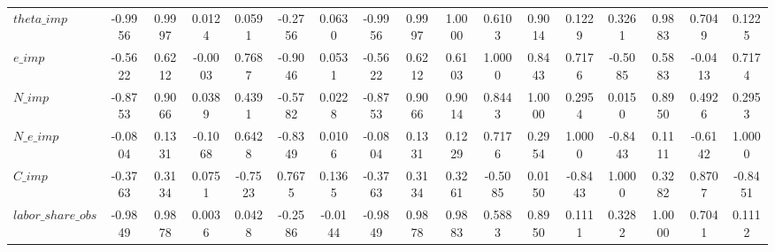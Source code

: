 \begin{center}
\begin{longtable}{lcccccccccccccccc}
$theta\_imp         $	 & 	              -0.9956	 & 	               0.9997	 & 	               0.0124	 & 	               0.0591	 & 	              -0.2756	 & 	               0.0630	 & 	              -0.9956	 & 	               0.9997	 & 	               1.0000	 & 	               0.6103	 & 	               0.9014	 & 	               0.1229	 & 	               0.3261	 & 	               0.9883	 & 	               0.7049	 & 	               0.1225 \\ 
$e\_imp             $	 & 	              -0.5622	 & 	               0.6212	 & 	              -0.0003	 & 	               0.7687	 & 	              -0.9046	 & 	               0.0531	 & 	              -0.5622	 & 	               0.6212	 & 	               0.6103	 & 	               1.0000	 & 	               0.8443	 & 	               0.7176	 & 	              -0.5085	 & 	               0.5883	 & 	              -0.0413	 & 	               0.7174 \\ 
$N\_imp             $	 & 	              -0.8753	 & 	               0.9066	 & 	               0.0389	 & 	               0.4391	 & 	              -0.5782	 & 	               0.0228	 & 	              -0.8753	 & 	               0.9066	 & 	               0.9014	 & 	               0.8443	 & 	               1.0000	 & 	               0.2954	 & 	               0.0150	 & 	               0.8950	 & 	               0.4926	 & 	               0.2953 \\ 
$N\_e\_imp          $	 & 	              -0.0804	 & 	               0.1331	 & 	              -0.1068	 & 	               0.6428	 & 	              -0.8349	 & 	               0.0106	 & 	              -0.0804	 & 	               0.1331	 & 	               0.1229	 & 	               0.7176	 & 	               0.2954	 & 	               1.0000	 & 	              -0.8443	 & 	               0.1111	 & 	              -0.6142	 & 	               1.0000 \\ 
$C\_imp             $	 & 	              -0.3763	 & 	               0.3134	 & 	               0.0751	 & 	              -0.7523	 & 	               0.7675	 & 	               0.1365	 & 	              -0.3763	 & 	               0.3134	 & 	               0.3261	 & 	              -0.5085	 & 	               0.0150	 & 	              -0.8443	 & 	               1.0000	 & 	               0.3282	 & 	               0.8707	 & 	              -0.8451 \\ 
$labor\_share\_obs  $	 & 	              -0.9849	 & 	               0.9878	 & 	               0.0036	 & 	               0.0428	 & 	              -0.2586	 & 	              -0.0144	 & 	              -0.9849	 & 	               0.9878	 & 	               0.9883	 & 	               0.5883	 & 	               0.8950	 & 	               0.1111	 & 	               0.3282	 & 	               1.0000	 & 	               0.7041	 & 	               0.1112 \\ 

\end{longtable}
\end{center}
